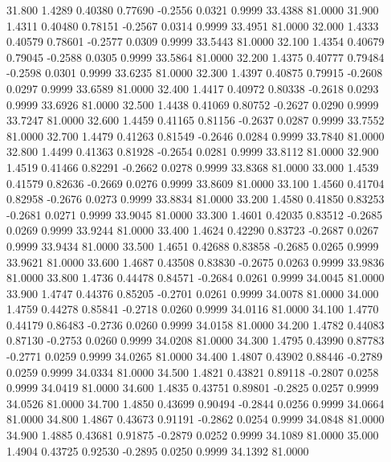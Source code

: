   31.800   1.4289   0.40380   0.77690  -0.2556   0.0321   0.9999  33.4388  81.0000
  31.900   1.4311   0.40480   0.78151  -0.2567   0.0314   0.9999  33.4951  81.0000
  32.000   1.4333   0.40579   0.78601  -0.2577   0.0309   0.9999  33.5443  81.0000
  32.100   1.4354   0.40679   0.79045  -0.2588   0.0305   0.9999  33.5864  81.0000
  32.200   1.4375   0.40777   0.79484  -0.2598   0.0301   0.9999  33.6235  81.0000
  32.300   1.4397   0.40875   0.79915  -0.2608   0.0297   0.9999  33.6589  81.0000
  32.400   1.4417   0.40972   0.80338  -0.2618   0.0293   0.9999  33.6926  81.0000
  32.500   1.4438   0.41069   0.80752  -0.2627   0.0290   0.9999  33.7247  81.0000
  32.600   1.4459   0.41165   0.81156  -0.2637   0.0287   0.9999  33.7552  81.0000
  32.700   1.4479   0.41263   0.81549  -0.2646   0.0284   0.9999  33.7840  81.0000
  32.800   1.4499   0.41363   0.81928  -0.2654   0.0281   0.9999  33.8112  81.0000
  32.900   1.4519   0.41466   0.82291  -0.2662   0.0278   0.9999  33.8368  81.0000
  33.000   1.4539   0.41579   0.82636  -0.2669   0.0276   0.9999  33.8609  81.0000
  33.100   1.4560   0.41704   0.82958  -0.2676   0.0273   0.9999  33.8834  81.0000
  33.200   1.4580   0.41850   0.83253  -0.2681   0.0271   0.9999  33.9045  81.0000
  33.300   1.4601   0.42035   0.83512  -0.2685   0.0269   0.9999  33.9244  81.0000
  33.400   1.4624   0.42290   0.83723  -0.2687   0.0267   0.9999  33.9434  81.0000
  33.500   1.4651   0.42688   0.83858  -0.2685   0.0265   0.9999  33.9621  81.0000
  33.600   1.4687   0.43508   0.83830  -0.2675   0.0263   0.9999  33.9836  81.0000
  33.800   1.4736   0.44478   0.84571  -0.2684   0.0261   0.9999  34.0045  81.0000
  33.900   1.4747   0.44376   0.85205  -0.2701   0.0261   0.9999  34.0078  81.0000
  34.000   1.4759   0.44278   0.85841  -0.2718   0.0260   0.9999  34.0116  81.0000
  34.100   1.4770   0.44179   0.86483  -0.2736   0.0260   0.9999  34.0158  81.0000
  34.200   1.4782   0.44083   0.87130  -0.2753   0.0260   0.9999  34.0208  81.0000
  34.300   1.4795   0.43990   0.87783  -0.2771   0.0259   0.9999  34.0265  81.0000
  34.400   1.4807   0.43902   0.88446  -0.2789   0.0259   0.9999  34.0334  81.0000
  34.500   1.4821   0.43821   0.89118  -0.2807   0.0258   0.9999  34.0419  81.0000
  34.600   1.4835   0.43751   0.89801  -0.2825   0.0257   0.9999  34.0526  81.0000
  34.700   1.4850   0.43699   0.90494  -0.2844   0.0256   0.9999  34.0664  81.0000
  34.800   1.4867   0.43673   0.91191  -0.2862   0.0254   0.9999  34.0848  81.0000
  34.900   1.4885   0.43681   0.91875  -0.2879   0.0252   0.9999  34.1089  81.0000
  35.000   1.4904   0.43725   0.92530  -0.2895   0.0250   0.9999  34.1392  81.0000
